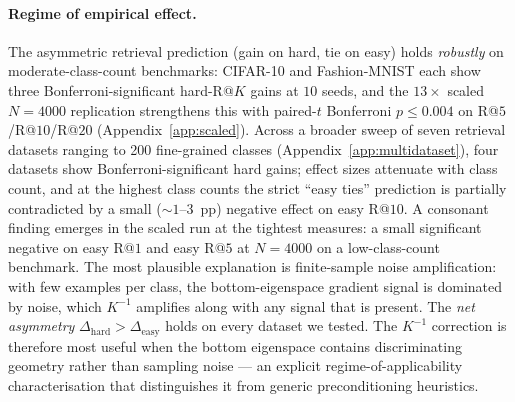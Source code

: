 \documentclass{article}
\begin{document}
\paragraph{Regime of empirical effect.}
The asymmetric retrieval prediction (gain on hard, tie on easy) holds
\emph{robustly} on moderate-class-count benchmarks: CIFAR-10 and
Fashion-MNIST each show three Bonferroni-significant hard-R@$K$ gains
at $10$ seeds, and the $13\times$ scaled $N{=}4000$ replication
strengthens this with paired-$t$ Bonferroni $p\!\leq\!0.004$ on
R@$5$/R@$10$/R@$20$ (Appendix~\ref{app:scaled}). Across a broader
sweep of seven retrieval datasets ranging to 200 fine-grained classes
(Appendix~\ref{app:multidataset}), four datasets show
Bonferroni-significant hard gains; effect sizes attenuate with class
count, and at the highest class counts the strict ``easy ties''
prediction is partially contradicted by a small ($\sim 1$--$3$~pp)
negative effect on easy R@$10$. A consonant finding emerges in the
scaled run at the tightest measures: a small significant negative on
easy R@$1$ and easy R@$5$ at $N{=}4000$ on a low-class-count benchmark.
The most plausible explanation is finite-sample noise amplification:
with few examples per class, the bottom-eigenspace gradient signal is
dominated by noise, which $K^{-1}$ amplifies along with any signal
that is present. The \emph{net asymmetry}
$\Delta_{\text{hard}} > \Delta_{\text{easy}}$ holds on every dataset
we tested. The $K^{-1}$ correction is therefore
most useful when the bottom eigenspace contains discriminating
geometry rather than sampling noise --- an explicit
regime-of-applicability characterisation that distinguishes it from
generic preconditioning heuristics.
\end{document}
